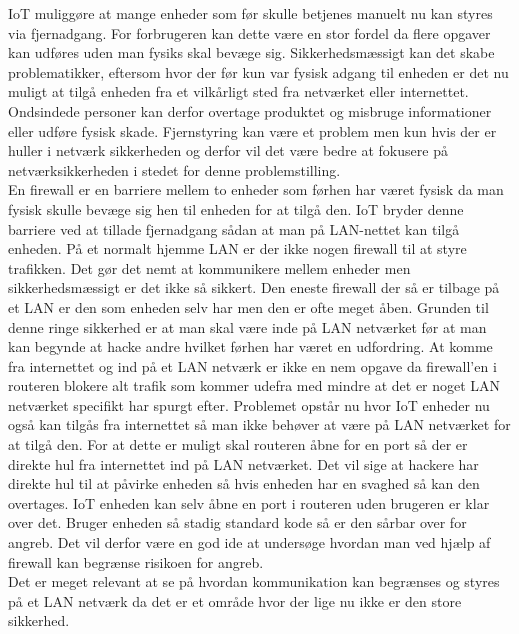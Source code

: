     IoT muliggøre at mange enheder som før skulle betjenes manuelt nu kan styres via fjernadgang. For forbrugeren kan dette være en stor fordel da flere opgaver kan udføres uden man fysiks skal bevæge sig. Sikkerhedsmæssigt kan det skabe problematikker, eftersom hvor der før kun var fysisk adgang til enheden er det nu muligt at tilgå enheden fra et vilkårligt sted fra netværket eller internettet.\\ 
    Ondsindede personer kan derfor overtage produktet og misbruge informationer eller udføre fysisk skade. Fjernstyring kan være et problem men kun hvis der er huller i netværk sikkerheden og derfor vil det være bedre at fokusere på netværksikkerheden i stedet for denne problemstilling.\autocite{Forbes2017}\\
    En firewall er en barriere mellem to enheder som førhen har været fysisk da man fysisk skulle bevæge sig hen til enheden for at tilgå den. IoT bryder denne barriere ved at tillade fjernadgang sådan at man på LAN-nettet kan tilgå enheden. På et normalt hjemme LAN er der ikke nogen firewall til at styre trafikken. Det gør det nemt at kommunikere mellem enheder men sikkerhedsmæssigt er det ikke så sikkert. Den eneste firewall der så er tilbage på et LAN er den som enheden selv har men den er ofte meget åben. Grunden til denne ringe sikkerhed er at man skal være inde på LAN netværket før at man kan begynde at hacke andre hvilket førhen har været en udfordring. At komme fra internettet og ind på et LAN netværk er ikke en nem opgave da firewall'en i routeren blokere alt trafik som kommer udefra med mindre at det er noget LAN netværket specifikt har spurgt efter. Problemet opstår nu hvor IoT enheder nu også kan tilgås fra internettet så man ikke behøver at være på LAN netværket for at tilgå den. For at dette er muligt skal routeren åbne for en port så der er direkte hul fra internettet ind på LAN netværket. Det vil sige at hackere har direkte hul til at påvirke enheden så hvis enheden har en svaghed så kan den overtages. IoT enheden kan selv åbne en port i routeren uden brugeren er klar over det. Bruger enheden så stadig standard kode så er den sårbar over for angreb. Det vil derfor være en god ide at undersøge hvordan man ved hjælp af firewall kan begrænse risikoen for angreb.\\
    Det er meget relevant at se på hvordan kommunikation kan begrænses og styres på et LAN netværk da det er et område hvor der lige nu ikke er den store sikkerhed.
    
